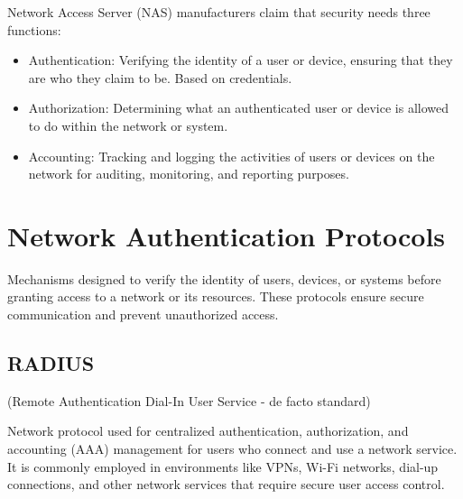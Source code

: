 Network Access Server (NAS) manufacturers claim that security needs three functions:
\begin{itemize}
    \item Authentication: Verifying the identity of a user or device, ensuring that they are who they claim to be. Based on credentials.
    \item Authorization: Determining what an authenticated user or device is allowed to do within the network or system.
    \item Accounting: Tracking and logging the activities of users or devices on the network for auditing, monitoring, and reporting purposes.
\end{itemize}

\section{Network Authentication Protocols}
Mechanisms designed to verify the identity of users, devices, or systems before granting access to a network or its resources. These protocols ensure secure communication and prevent unauthorized access.

\subsection{RADIUS}
\begin{center}
    (Remote Authentication Dial-In User Service - de facto standard)
\end{center}
Network protocol used for centralized authentication, authorization, and accounting (AAA) management for users who connect and use a network service. It is commonly employed in environments like VPNs, Wi-Fi networks, dial-up connections, and other network services that require secure user access control.

